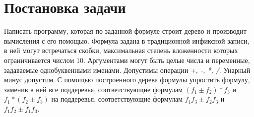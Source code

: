 \section{Постановка задачи}
\par
Написать программу, которая по заданной формуле строит дерево и производит
вычисления с его помощью. Формула задана в традиционной инфиксной записи, в
ней могут встречаться скобки, максимальная степень вложенности которых
ограничивается числом 10. Аргументами могут быть целые числа и переменные,
задаваемые однобуквенными именами. Допустимы операции {\it +, -, *, /}.
Унарный минус допустим. С помощью построенного дерева формулы упростить
формулу, заменив в ней все поддеревья, соответствующие формулам $ (f_1 \pm f_2
)*f_3$ и $f_1*(f_2 \pm f_3)$ на поддеревья, соответствующие формулам $f_1f_3
\pm f_2f_3$ и $f_1f_2 \pm f_1f_3$.
\pagebreak

